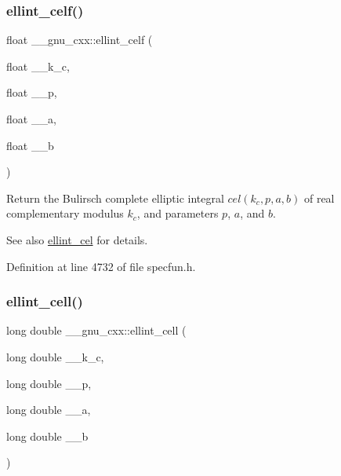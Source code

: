 \subsubsection{\texorpdfstring{ellint\+\_\+celf()}{ellint\_celf()}}
{\footnotesize\ttfamily float \+\_\+\+\_\+gnu\+\_\+cxx\+::ellint\+\_\+celf (\begin{DoxyParamCaption}\item[{float}]{\+\_\+\+\_\+k\+\_\+c,  }\item[{float}]{\+\_\+\+\_\+p,  }\item[{float}]{\+\_\+\+\_\+a,  }\item[{float}]{\+\_\+\+\_\+b }\end{DoxyParamCaption})\hspace{0.3cm}{\ttfamily [inline]}}

Return the Bulirsch complete elliptic integral $ cel(k_c,p,a,b) $ of real complementary modulus $ k_c $, and parameters $ p $, $ a $, and $ b $.

\begin{DoxySeeAlso}{See also}
\hyperlink{group__gnu__math__spec__func_ga6e44a0d90500e56ef4b3aba6efd7e2b0}{ellint\+\_\+cel} for details. 
\end{DoxySeeAlso}


Definition at line 4732 of file specfun.\+h.

\mbox{\label{group__gnu__math__spec__func_gaa5add699fb2b4b02e63f8725a3a79750}} 
\subsubsection{\texorpdfstring{ellint\+\_\+cell()}{ellint\_cell()}}
{\footnotesize\ttfamily long double \+\_\+\+\_\+gnu\+\_\+cxx\+::ellint\+\_\+cell (\begin{DoxyParamCaption}\item[{long double}]{\+\_\+\+\_\+k\+\_\+c,  }\item[{long double}]{\+\_\+\+\_\+p,  }\item[{long double}]{\+\_\+\+\_\+a,  }\item[{long double}]{\+\_\+\+\_\+b }\end{DoxyParamCaption})\hspace{0.3cm}{\ttfamily [inline]}}

